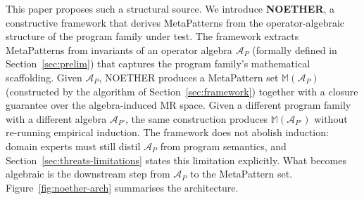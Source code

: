 \documentclass[acmsmall,screen,review]{acmart}
\begin{document}
This paper proposes such a structural source. We introduce \textbf{NOETHER}, a constructive framework that derives MetaPatterns from the operator-algebraic structure of the program family under test. The framework extracts MetaPatterns from invariants of an operator algebra $\mathcal{A}_P$ (formally defined in Section~\ref{sec:prelim}) that captures the program family's mathematical scaffolding. Given $\mathcal{A}_P$, NOETHER produces a MetaPattern set $\mathbb{M}(\mathcal{A}_P)$ (constructed by the algorithm of Section~\ref{sec:framework}) together with a closure guarantee over the algebra-induced MR space. Given a different program family with a different algebra $\mathcal{A}_{P'}$, the same construction produces $\mathbb{M}(\mathcal{A}_{P'})$ without re-running empirical induction. The framework does not abolish induction: domain experts must still distil $\mathcal{A}_P$ from program semantics, and Section~\ref{sec:threats-limitations} states this limitation explicitly. What becomes algebraic is the downstream step from $\mathcal{A}_P$ to the MetaPattern set. Figure~\ref{fig:noether-arch} summarises the architecture.
\end{document}
